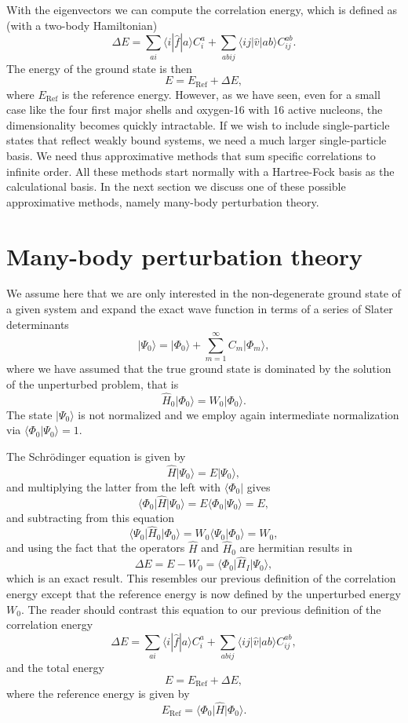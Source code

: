 With the eigenvectors we can compute
  the correlation energy, which is defined as (with a two-body Hamiltonian)
  \[
  \Delta E=\sum_{ai}\langle i| \hat{f}|a \rangle C_{i}^{a}+
  \sum_{abij}\langle ij | \hat{v}| ab \rangle C_{ij}^{ab}.
  \]
The energy of  the ground state is then
  \[
  E=E_{\mathrm{Ref}}+\Delta E,
  \]
where $E_{\mathrm{Ref}}$ is the reference energy.
  However, as we have seen, even for a
  small case like the four first major shells and 
  oxygen-16 with 16 active nucleons, the dimensionality becomes quickly intractable. If we
  wish to include single-particle states that reflect weakly bound
  systems, we need a much larger single-particle basis. We need thus
  approximative methods that sum specific correlations to infinite
  order.  All these methods start normally with a Hartree-Fock basis
  as the calculational basis. In the next section we discuss one of
  these possible approximative methods, namely many-body perturbation
  theory.

  \section{Many-body perturbation theory}\label{sec:chap8mbpt}

  We assume here that we are only interested in the non-degenerate
  ground state of a given system and expand the exact wave function in
  terms of a series of Slater determinants
  \[
  \vert \Psi_0\rangle = \vert \Phi_0\rangle +
  \sum_{m=1}^{\infty}C_m\vert \Phi_m\rangle,
  \]
  where we have assumed that the true ground state is dominated by the
  solution of the unperturbed problem, that is
  \[
  \hat{H}_0\vert \Phi_0\rangle= W_0\vert \Phi_0\rangle.
  \]
  The state $\vert \Psi_0\rangle$ is not normalized and we employ again
  intermediate normalization via $\langle \Phi_0 \vert
  \Psi_0\rangle=1$.

  The Schr\"odinger equation is given by
  \[
  \hat{H}\vert \Psi_0\rangle = E\vert \Psi_0\rangle,
  \]
  and multiplying the latter from the left with $\langle \Phi_0\vert $
  gives
  \[
  \langle \Phi_0\vert \hat{H}\vert \Psi_0\rangle = E\langle
  \Phi_0\vert \Psi_0\rangle=E,
  \]
  and subtracting from this equation
  \[
  \langle \Psi_0\vert \hat{H}_0\vert \Phi_0\rangle= W_0\langle
  \Psi_0\vert \Phi_0\rangle=W_0,
  \]
  and using the fact that the  operators $\hat{H}$ and $\hat{H}_0$
  are hermitian results in
  \begin{equation}\label{eq:mbptcorrel}
  \Delta E=E-W_0=\langle \Phi_0\vert \hat{H}_I\vert \Psi_0\rangle,
  \end{equation}
  which is an exact result. This resembles our previous definition of the correlation energy except that the reference energy is now defined
by the unperturbed energy $W_0$. The reader should contrast this equation to our previous definition of the correlation energy
  \[
  \Delta E=\sum_{ai}\langle i| \hat{f}|a \rangle C_{i}^{a}+
  \sum_{abij}\langle ij | \hat{v}| ab \rangle C_{ij}^{ab},
  \]
and the total energy
  \[
  E=E_{\mathrm{Ref}}+\Delta E,
  \]
where the reference energy is given by
\[   
   E_{\mathrm{Ref}}= \langle \Phi_0 \vert \hat{H} \vert \Phi_0\rangle.
\]


